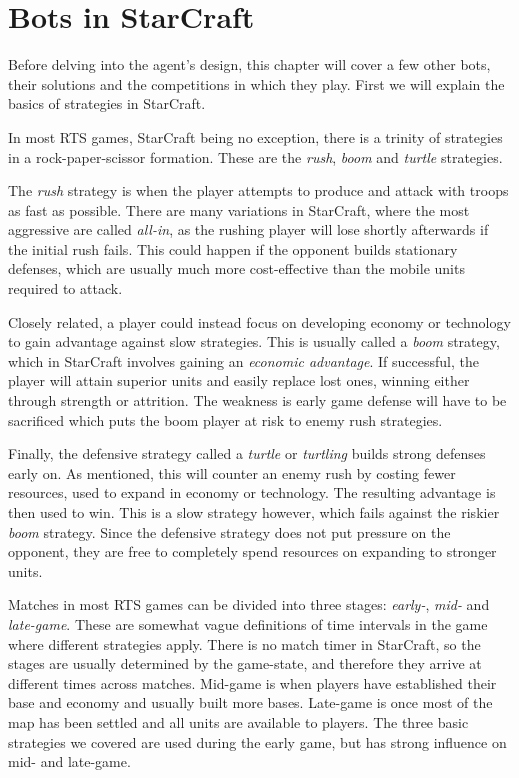 \chapter{Bots in StarCraft}
\label{ch:related}
Before delving into the agent's design, this chapter will cover a few other bots, their solutions and the competitions in which they play. First we will explain the basics of strategies in StarCraft.

In most RTS games, StarCraft being no exception, there is a trinity of strategies in a rock-paper-scissor formation. These are the \emph{rush}, \emph{boom} and \emph{turtle} strategies.

The \emph{rush} strategy is when the player attempts to produce and attack with troops as fast as possible. There are many variations in StarCraft, where the most aggressive are called \emph{all-in}, as the rushing player will lose shortly afterwards if the initial rush fails. This could happen if the opponent builds stationary defenses, which are usually much more cost-effective than the mobile units required to attack.

Closely related, a player could instead focus on developing economy or technology to gain advantage against slow strategies. This is usually called a \emph{boom} strategy, which in StarCraft involves gaining an \emph{economic advantage}. If successful, the player will attain superior units and easily replace lost ones, winning either through strength or attrition. The weakness is early game defense will have to be sacrificed which puts the boom player at risk to enemy rush strategies.

Finally, the defensive strategy called a \emph{turtle} or \emph{turtling} builds strong defenses early on. As mentioned, this will counter an enemy rush by costing fewer resources, used to expand in economy or technology. The resulting advantage is then used to win. This is a slow strategy however, which fails against the riskier \emph{boom} strategy. Since the defensive strategy does not put pressure on the opponent, they are free to completely spend resources on expanding to stronger units.

Matches in most RTS games can be divided into three stages: \emph{early-}, \emph{mid-} and \emph{late-game}. These are somewhat vague definitions of time intervals in the game where different strategies apply. There is no match timer in StarCraft, so the stages are usually determined by the game-state, and therefore they arrive at different times across matches. Mid-game is when players have established their base and economy and usually built more bases. Late-game is once most of the map has been settled and all units are available to players. The three basic strategies we covered are used during the early game, but has strong influence on mid- and late-game.

